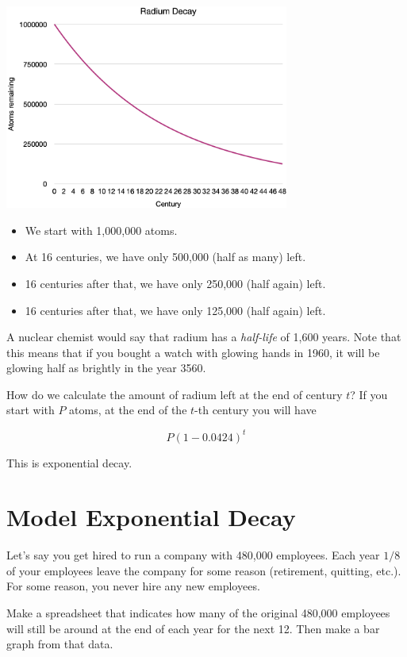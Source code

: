 \includegraphics[width=0.7\textwidth]{radium_decay.png}
 
\begin{itemize}
\item We start with 1,000,000 atoms.
\item At 16 centuries, we have only 500,000 (half as many) left.
\item 16 centuries after that, we have only 250,000 (half again) left.
\item 16 centuries after that, we have only 125,000 (half again) left.
\end{itemize}

A nuclear chemist would say that radium has a \textit{half-life} of
1,600 years. Note that this means that if you bought a watch with
glowing hands in 1960, it will be glowing half as brightly in the year
3560.

How do we calculate the amount of radium left at the end of century
$t$? If you start with $P$ atoms, at the end of the $t$-th century you
will have

$$P\left(1 - 0.0424\right)^t$$

This is exponential decay.
\section{Model Exponential Decay}

Let's say you get hired to run a company with 480,000
employees. Each year $1/8$ of your employees leave the company for
some reason (retirement, quitting, etc.). For some reason, you never
hire any new employees.

Make a spreadsheet that indicates how many of the original 480,000
employees will still be around at the end of each year for the next 12. Then make a
bar graph from that data.
